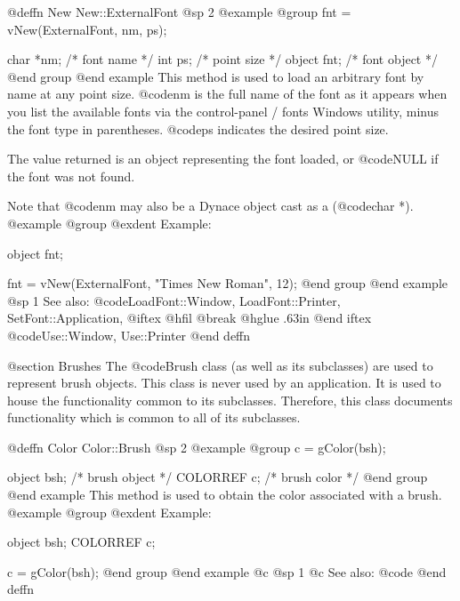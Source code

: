 @deffn {New} New::ExternalFont
@sp 2
@example
@group
fnt = vNew(ExternalFont, nm, ps);

char    *nm;    /*  font name    */
int     ps;     /*  point size   */
object  fnt;    /*  font object  */
@end group
@end example
This method is used to load an arbitrary font by name at any point size.
@code{nm} is the full name of the font as it appears
when you list the available fonts via the control-panel / fonts Windows
utility, minus the font type in parentheses.  @code{ps} indicates the
desired point size.

The value returned is an object representing the font loaded, or
@code{NULL} if the font was not found.

Note that @code{nm} may also be a Dynace object cast as a (@code{char *}).
@example
@group
@exdent Example:

object  fnt;

fnt = vNew(ExternalFont, "Times New Roman", 12);
@end group
@end example
@sp 1
See also:  @code{LoadFont::Window, LoadFont::Printer, SetFont::Application,}
@iftex
@hfil @break @hglue .63in 
@end iftex
@code{Use::Window, Use::Printer}
@end deffn









@section Brushes
The @code{Brush} class (as well as its subclasses) are used to represent
brush objects.  This class is never used by an application.  It is used
to house the functionality common to its subclasses.  Therefore, this
class documents functionality which is common to all of its subclasses.









@deffn {Color} Color::Brush
@sp 2
@example
@group
c = gColor(bsh);

object    bsh;  /*  brush object   */
COLORREF  c;    /*  brush color    */
@end group
@end example
This method is used to obtain the color associated with a brush.
@example
@group
@exdent Example:

object  bsh;
COLORREF  c;

c = gColor(bsh);
@end group
@end example
@c @sp 1
@c See also:  @code{}
@end deffn










